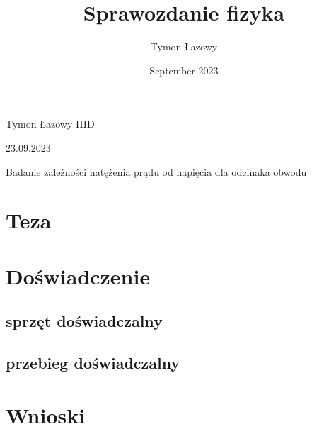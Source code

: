 \documentclass{article}
\title{Sprawozdanie fizyka}
\author{Tymon Łazowy}
\date{September 2023}
\begin{document}
\begin{center}
    \begin{multicols}{2}
    \begin{flushleft}
    \large{Tymon Łazowy IIID} \\
    \end{flushleft}
    
    \begin{flushright}
    \large{23.09.2023}\\
    \end{flushright}
    \end{multicols}
    {\LARGE Badanie zależności natężenia prądu od napięcia dla odcinaka obwodu} \\ \vspace{0pt}
\end{center}

\section{Teza}
\section{Doświadczenie}
\subsection{sprzęt doświadczalny}




\subsection{przebieg doświadczalny }
\begin{center}





\end{center}
\section{Wnioski}
\end{document}
